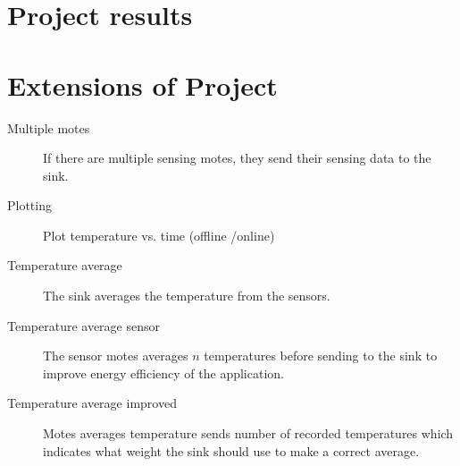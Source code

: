 \documentclass[a4paper,11pt,titlepage]{article}
\begin{document}
\section{Project results}

\section{Extensions of Project}
\begin{description}
\item[Multiple motes] If there are multiple sensing motes, they send their sensing data to the sink.
\item[Plotting] Plot temperature vs. time (offline /online)
\item[Temperature average] The sink averages the temperature from the sensors.
\item[Temperature average sensor] The sensor motes averages $n$ temperatures before sending to the sink to improve energy efficiency of the application.
\item[Temperature average improved] Motes averages temperature sends number of recorded temperatures which indicates what weight the sink should use to make a correct average.

\end{description}


\newpage

\end{document}
